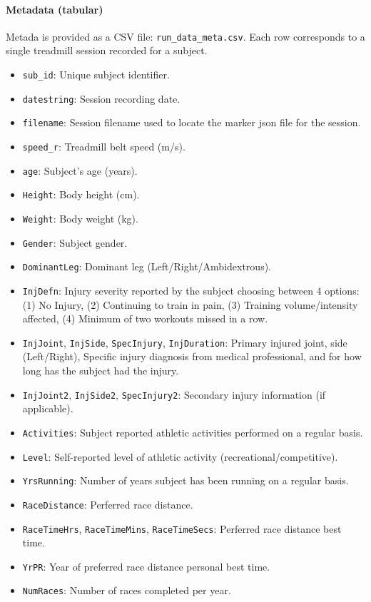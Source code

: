 \paragraph{Metadata (tabular)} Metada is provided as a CSV file: \texttt{run\_data\_meta.csv}. Each row corresponds to a single treadmill session recorded for a subject.
\begin{itemize}
    \item \texttt{sub\_id}: Unique subject identifier.
    \item \texttt{datestring}: Session recording date.
    \item \texttt{filename}: Session filename used to locate the marker json file for the session.
    \item \texttt{speed\_r}: Treadmill belt speed (m/s).
    \item \texttt{age}: Subject's age (years).
    \item \texttt{Height}: Body height (cm).
    \item \texttt{Weight}: Body weight (kg).
    \item \texttt{Gender}: Subject gender.
    \item \texttt{DominantLeg}: Dominant leg (Left/Right/Ambidextrous).
    \item \texttt{InjDefn}: Injury severity reported by the subject choosing between 4 options: (1) No Injury, (2) Continuing to train in pain, (3) Training volume/intensity affected, (4) Minimum of two workouts missed in a row.
    \item \texttt{InjJoint}, \texttt{InjSide}, \texttt{SpecInjury}, \texttt{InjDuration}: Primary injured joint, side (Left/Right), Specific injury diagnosis from medical professional, and for how long has the subject had the injury.
    \item \texttt{InjJoint2}, \texttt{InjSide2}, \texttt{SpecInjury2}: Secondary injury information (if applicable).
    \item \texttt{Activities}: Subject reported athletic activities performed on a regular basis.
    \item \texttt{Level}: Self-reported level of athletic activity (recreational/competitive).
    \item \texttt{YrsRunning}: Number of years subject has been running on a regular basis.
    \item \texttt{RaceDistance}: Perferred race distance.
    \item \texttt{RaceTimeHrs}, \texttt{RaceTimeMins}, \texttt{RaceTimeSecs}: Perferred race distance best time.
    \item \texttt{YrPR}: Year of preferred race distance personal best time.
    \item \texttt{NumRaces}: Number of races completed per year.
\end{itemize}

